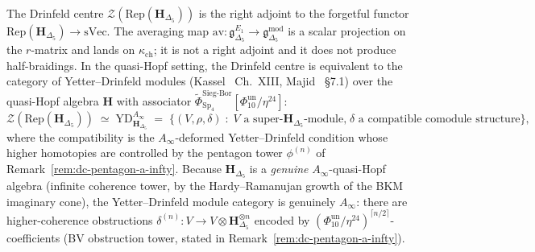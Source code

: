 \begin{remark}
\label{rem:dc-h-delta5-center}
The Drinfeld centre
$\mathcal{Z}(\mathrm{Rep}(\mathbf{H}_{\Delta_5}))$ is the right
adjoint to the forgetful functor $\mathrm{Rep}(\mathbf{H}_{\Delta_5})
\to \mathrm{sVec}$. The averaging map
$\mathrm{av}\colon\mathfrak g^{E_1}_{\Delta_5}\to
\mathfrak g^{\mathrm{mod}}_{\Delta_5}$ is a scalar projection on the
$r$-matrix and lands on $\kappa_{\mathrm{ch}}$; it is not a right
adjoint and it does not produce half-braidings. In the quasi-Hopf
setting, the Drinfeld centre is equivalent to the category
of Yetter--Drinfeld modules (Kassel~\cite{Kassel1995} Ch.~XIII,
Majid~\cite{Majid1995} \S7.1) over the quasi-Hopf algebra $\mathbf{H}$
with associator $\widetilde{\Phi}^{\mathrm{Sieg\text{-}Bor}}_{\mathrm{Sp}_4}[\Phi_{10}^{\mathrm{un}}/\eta^{24}]$:
\begin{equation}
\label{eq:dc-center-yd-equivalence}
 \mathcal{Z}(\mathrm{Rep}(\mathbf{H}_{\Delta_5}))
 \;\simeq\;
 \mathrm{YD}^{A_\infty}_{\mathbf{H}_{\Delta_5}}
 \;=\;
 \bigl\{ (V,\rho,\delta) \;:\; V \text{ a super-$\mathbf{H}_{\Delta_5}$-module,}\;
 \delta \text{ a compatible comodule structure} \bigr\},
\end{equation}
where the compatibility is the $A_\infty$-deformed Yetter--Drinfeld
condition whose higher homotopies are controlled by the pentagon tower
$\phi^{(n)}$ of Remark~\ref{rem:dc-pentagon-a-infty}. Because
$\mathbf{H}_{\Delta_5}$ is a \emph{genuine} $A_\infty$-quasi-Hopf
algebra (infinite coherence tower, by the Hardy--Ramanujan growth of
the BKM imaginary cone), the Yetter--Drinfeld module category is
genuinely $A_\infty$: there are higher-coherence obstructions
$\delta^{(n)}\colon V \to V \otimes \mathbf{H}_{\Delta_5}^{\otimes n}$
encoded by $(\Phi_{10}^{\mathrm{un}}/\eta^{24})^{\lceil n/2 \rceil}$-coefficients
(BV obstruction tower, stated in
Remark~\ref{rem:dc-pentagon-a-infty}).
\end{remark}

